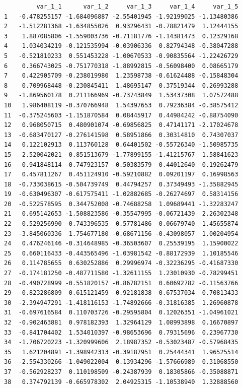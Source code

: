 \documentclass[
  letterpaper,
  DIV=11,
  numbers=noendperiod]{scrreprt}
\begin{document}
\begin{verbatim}
         var_1_1      var_1_2     var_1_3     var_1_4     var_1_5
1   -0.478255157 -1.684096887 -2.55401945 -1.92199025 -1.13480386
2   -1.512281368 -1.634855026  0.93296431 -0.78821479  1.12444155
3    1.887085806 -1.559003736 -0.71181776 -1.14381473  0.12329168
4    1.034034219 -0.121535994 -0.03906336  0.82794348 -0.38047288
5   -0.521810233  0.551453228 -1.00670533 -0.90835564 -1.22426729
6    0.366743025 -0.751770318 -1.88992815 -0.56098400  0.08665179
7    0.422905709 -0.238019980  1.23598738 -0.61624488 -0.15848304
8    0.709968448 -0.230845411  1.48695147  0.37519344  0.26993288
9   -1.869560178  0.211166969 -0.73743849  1.53437308  1.07572488
10   1.986408119 -0.370766948  1.54397653  0.79236384 -0.38575412
11  -0.375245603 -1.151870584  0.08445917  0.44984242 -0.88754090
12   0.968050715  0.480901074 -0.69856825  0.47141171 -2.17024678
13  -0.683470127 -0.276141598  0.58951866  0.30314810  0.74307037
14   0.122102913  0.113760128  0.64401502 -0.55726340 -1.50985735
15   2.520042021  0.851513679 -1.77899155 -1.41215767  1.58841623
16   0.941848114 -0.747923157 -0.50383579  0.44012640  0.19262479
17   0.457811267  0.451124910 -0.59210882  0.09201197  0.16998563
18  -0.733038615 -0.504739749  0.44794257  0.37349493 -1.35882945
19  -0.630496307 -0.617575411 -1.02882685 -0.26274697  0.58314156
20  -0.522578595  0.344752008 -0.74688258  1.09689441 -1.32283247
21   0.695142653 -1.508823586 -0.35547995 -0.06721439  2.26302348
22   0.529256990 -0.743396535  0.57781486  0.06679740 -1.45655874
23  -3.845060336  1.754677180 -0.68671156 -0.43098057  1.00204954
24   0.476246146 -0.314648985 -0.36503607  0.25539195  1.15900022
25   0.660116433 -0.443565496 -1.03981542 -0.88172939  1.10185546
26   0.114785655  0.630252886  0.29996974 -0.32236295 -0.41687330
27  -0.174181250 -0.487711580 -1.32611155  1.23010930 -0.78299451
28  -0.490728999 -0.551820157 -0.86782151  0.60692782 -0.11563766
29  -0.823286809  0.615121459 -0.92181838  0.67537034  0.70813433
30  -2.394947291 -1.418116153 -1.74892666 -0.31816385  1.26960878
31  -0.697616584  0.110703726 -0.29595804  0.12026351 -1.04961021
32  -0.902463881  0.978182393  1.32964129  1.08993898  0.16670897
33  -0.841704402  1.534010397 -0.98653696  0.79315696  0.23967730
34  -1.706720223 -1.320999606  2.18987352 -0.53023487 -0.57968435
35   1.621204891 -1.398942313 -0.39187951  0.25444341  1.96525514
36  -2.554330266 -1.049022004  0.13934296 -1.57666989  0.31068550
37  -0.562928237  0.110198509 -0.24387939  0.18305866 -0.35088871
38   0.374792139 -0.665978302  2.04925315 -1.10538940  1.32888560

\end{verbatim}
\end{document}
